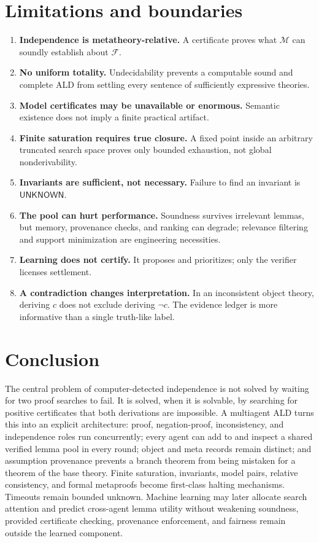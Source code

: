 \documentclass[11pt]{article}
\theoremstyle{definition}
\theoremstyle{remark}
\newcommand{\Unknown}{\mathsf{UNKNOWN}}
\newcommand{\M}{\mathcal M}
\newcommand{\F}{\mathcal F}
\begin{document}
\section{Limitations and boundaries}

\begin{enumerate}[label=\textbf{L\arabic*.}]
  \item \textbf{Independence is metatheory-relative.} A certificate proves what $\M$ can soundly establish about $\F$.
  \item \textbf{No uniform totality.} Undecidability prevents a computable sound and complete ALD from settling every sentence of sufficiently expressive theories.
  \item \textbf{Model certificates may be unavailable or enormous.} Semantic existence does not imply a finite practical artifact.
  \item \textbf{Finite saturation requires true closure.} A fixed point inside an arbitrary truncated search space proves only bounded exhaustion, not global nonderivability.
  \item \textbf{Invariants are sufficient, not necessary.} Failure to find an invariant is $\Unknown$.
  \item \textbf{The pool can hurt performance.} Soundness survives irrelevant lemmas, but memory, provenance checks, and ranking can degrade; relevance filtering and support minimization are engineering necessities.
  \item \textbf{Learning does not certify.} It proposes and prioritizes; only the verifier licenses settlement.
  \item \textbf{A contradiction changes interpretation.} In an inconsistent object theory, deriving $c$ does not exclude deriving $\neg c$. The evidence ledger is more informative than a single truth-like label.
\end{enumerate}

\section{Conclusion}
The central problem of computer-detected independence is not solved by waiting for two proof searches to fail. It is solved, when it is solvable, by searching for positive certificates that both derivations are impossible. A multiagent ALD turns this into an explicit architecture: proof, negation-proof, inconsistency, and independence roles run concurrently; every agent can add to and inspect a shared verified lemma pool in every round; object and meta records remain distinct; and assumption provenance prevents a branch theorem from being mistaken for a theorem of the base theory. Finite saturation, invariants, model pairs, relative consistency, and formal metaproofs become first-class halting mechanisms. Timeouts remain bounded unknown. Machine learning may later allocate search attention and predict cross-agent lemma utility without weakening soundness, provided certificate checking, provenance enforcement, and fairness remain outside the learned component.
\end{document}
